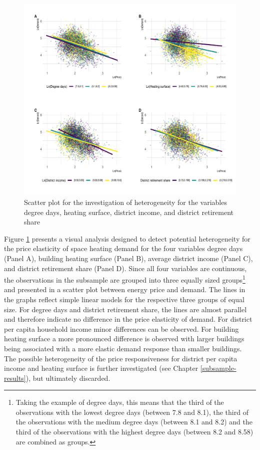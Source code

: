 \documentclass[12pt,twoside]{reedthesis}
\begin{document}
\newpage
\begin{figure}

{\centering \includegraphics[width=0.95\linewidth]{figure/other_variables_heterogeneity_plot} 

}

\caption{Scatter plot for the investigation of heterogeneity for the variables degree days, heating surface, district income, and district retirement share}\label{fig:other-variables-heterogeneity-plot}
\end{figure}
\noindent
Figure \ref{fig:other-variables-heterogeneity-plot} presents a visual analysis designed to detect potential heterogeneity for the price elasticity of space heating demand for the four variables degree days (Panel A), building heating surface (Panel B), average district income (Panel C), and district retirement share (Panel D). Since all four variables are continuous, the observations in the subsample are grouped into three equally sized groups\footnote{Taking the example of degree days, this means that the third of the observations with the lowest degree days (between 7.8 and 8.1), the third of the observations with the medium degree days (between 8.1 and 8.2) and the third of the observations with the highest degree days (between 8.2 and 8.58) are combined as groups.} and presented in a scatter plot between energy price and demand. The lines in the graphs reflect simple linear models for the respective three groups of equal size. For degree days and district retirement share, the lines are almost parallel and therefore indicate no difference in the price elasticity of demand. For district per capita household income minor differences can be observed. For building heating surface a more pronounced difference is observed with larger buildings being associated with a more elastic demand response than smaller buildings. The possible heterogeneity of the price responsiveness for district per capita income and heating surface is further investigated (see Chapter \ref{subsample-results}), but ultimately discarded.
\end{document}
